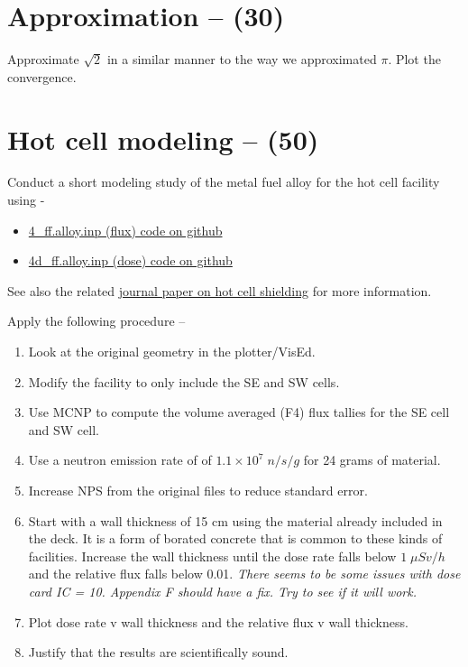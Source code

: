 \documentclass[11pt,a4paper]{article}
\begin{document}
\newpage

\section{Approximation -- (30)}
Approximate $\sqrt{2}$ in a similar manner to the way we approximated $\pi$. Plot the convergence. 





\newpage

\section{Hot cell modeling -- (50)}
Conduct a short modeling study of the metal fuel alloy for the hot cell facility using - 
\begin{itemize}
    \item\href{https://github.com/TheDoctorRAB/mcnpx.decks/blob/master/neutron.flux/input/4_ff.alloy.inp}{4\_ff.alloy.inp (flux) code on github}
    \item\href{https://github.com/TheDoctorRAB/mcnpx.decks/blob/master/neutron.flux/input/4d_ff.alloy.inp}{4d\_ff.alloy.inp (dose) code on github}
\end{itemize}

See also the related \href{https://www.sciencedirect.com/science/article/abs/pii/S0029549316301066}{journal paper on hot cell shielding} for more information. 

Apply the following procedure -- 
\begin{enumerate}
    \item Look at the original geometry in the plotter/VisEd.
    \item Modify the facility to only include the SE and SW cells.
    \item Use MCNP to compute the volume averaged (F4) flux tallies for the SE cell and SW cell.
    \item Use a neutron emission rate of of $1.1 \times 10^7 \; n/s/g$ for 24 grams of material. 
    \item Increase NPS from the original files to reduce standard error.
    \item Start with a wall thickness of 15 cm using the material already included in the deck. It is a form of borated concrete that is common to these kinds of facilities. Increase the wall thickness until the dose rate falls below $1 \; \mu Sv/h$ and the relative flux falls below 0.01. \textit{There seems to be some issues with dose card IC = 10. Appendix F should have a fix. Try to see if it will work.}
    \item Plot dose rate v wall thickness and the relative flux v wall thickness.
    \item Justify that the results are scientifically sound.
\end{enumerate}
\end{document}
